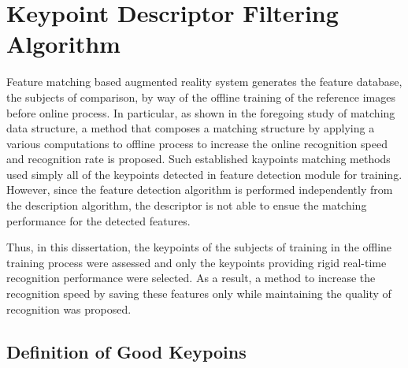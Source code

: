 
\section{Keypoint Descriptor Filtering Algorithm}
\label{sec:proposed}


Feature matching based augmented reality system generates the feature database, the subjects of comparison, by way of the offline training of the reference images before online process. In particular, as shown in the foregoing study of matching data structure, a method that composes a matching structure by applying a various computations to offline process to increase the online recognition speed and recognition rate is proposed. Such established kaypoints matching methods used simply all of the keypoints detected in feature detection module for training. However, since the feature detection algorithm is performed independently from the description algorithm, the descriptor is not able to ensue the matching performance for the detected features. 


Thus, in this dissertation, the keypoints of the subjects of training in the offline training process were assessed and only the keypoints providing rigid real-time recognition performance were selected. As a result, a method to increase the recognition speed by saving these features only while maintaining the quality of recognition was proposed. 


\subsection{Definition of Good Keypoins}

